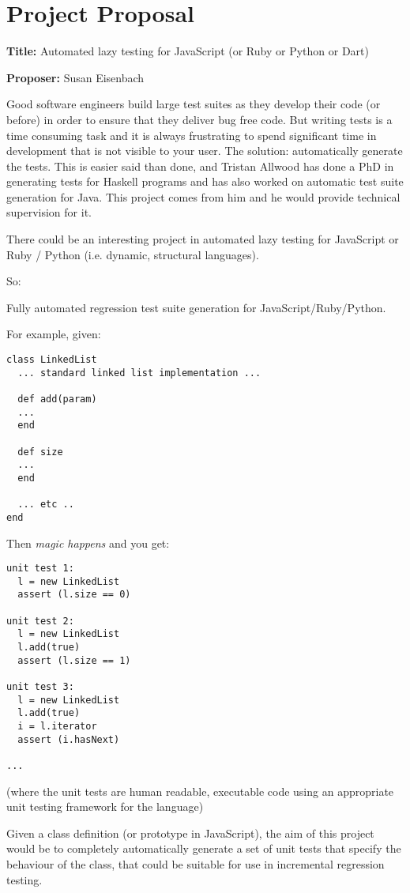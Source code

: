 \appendix
\chapter{Project Proposal}
\label{appx:proposal}
\textbf{Title:} Automated lazy testing for JavaScript (or Ruby or Python or
Dart)

\textbf{Proposer:} Susan Eisenbach

Good software engineers build large test suites as they develop their code (or before) in order to ensure that they deliver bug free code.
But writing tests is a time consuming task and it is always frustrating to spend significant time in development that is not visible to your user.
The solution: automatically generate the tests.
This is easier said than done, and Tristan Allwood has done a PhD in generating tests for Haskell programs and has also worked on automatic test suite generation for Java.
This project comes from him and he would provide technical supervision for it.

There could be an interesting project in automated lazy testing for
JavaScript or Ruby / Python (i.e. dynamic, structural languages).

So:

Fully automated regression test suite generation for
JavaScript/Ruby/Python.

For example, given:
\begin{verbatim}
class LinkedList
  ... standard linked list implementation ...

  def add(param)
  ...
  end

  def size
  ...
  end

  ... etc ..
end
\end{verbatim}

Then \emph{magic happens} and you get:

\begin{verbatim}
unit test 1:
  l = new LinkedList
  assert (l.size == 0)

unit test 2:
  l = new LinkedList
  l.add(true)
  assert (l.size == 1)

unit test 3:
  l = new LinkedList
  l.add(true)
  i = l.iterator
  assert (i.hasNext)

...
\end{verbatim}

(where the unit tests are human readable, executable code using an
appropriate unit testing framework for the language)

Given a class definition (or prototype in JavaScript), the aim of this
project would be to completely automatically generate a set of unit
tests that specify the behaviour of the class, that could be suitable
for use in incremental regression testing.

